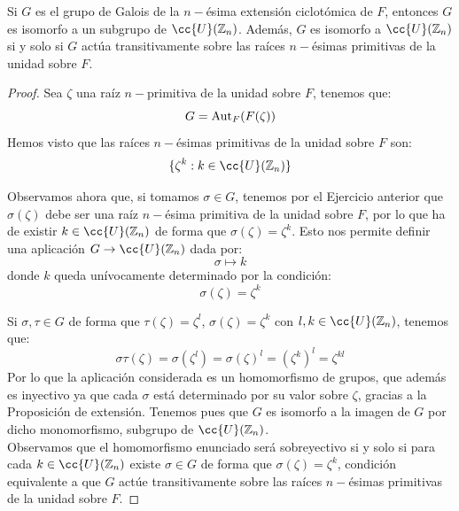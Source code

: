 \begin{prop}\label{prop:grupo_galois_ciclotomico}
    Si $G$ es el grupo de Galois de la $n-$ésima extensión ciclotómica de $F$, entonces $G$ es isomorfo a un subgrupo de $\cc{U}(\mathbb{Z}_n)$.\newline
    Además, $G$ es isomorfo a $\cc{U}(\mathbb{Z}_n)$ si y solo si $G$ actúa transitivamente sobre las raíces $n-$ésimas primitivas de la unidad sobre $F$.
    \begin{proof}
        Sea $\zeta$ una raíz $n-$primitiva de la unidad sobre $F$, tenemos que:
        \begin{equation*}
            G = \operatorname{Aut}_F(F(\zeta))
        \end{equation*}
        Hemos visto que las raíces $n-$ésimas primitivas de la unidad sobre $F$ son:
        \begin{equation*}
            \{\zeta^k : k\in \cc{U}(\mathbb{Z}_n)\}            
        \end{equation*}

        Observamos ahora que, si tomamos $\sigma\in G$, tenemos por el Ejercicio anterior que $\sigma(\zeta)$ debe ser una raíz $n-$ésima primitiva de la unidad sobre $F$, por lo que ha de existir $k\in \cc{U}(\mathbb{Z}_n)$ de forma que $\sigma(\zeta)=\zeta^k$. Esto nos permite definir una aplicación $G\to \cc{U}(\mathbb{Z}_n)$ dada por:
        \begin{equation*}
            \sigma \longmapsto k
        \end{equation*}
        donde $k$ queda unívocamente determinado por la condición:
        \begin{equation*}
            \sigma(\zeta) = \zeta^k
        \end{equation*}

        Si $\sigma,\tau\in G$ de forma que $\tau(\zeta) = \zeta^l$, $\sigma(\zeta)=\zeta^k$ con $l,k\in \cc{U}(\mathbb{Z}_n)$, tenemos que:
        \begin{equation*}
            \sigma\tau(\zeta) = \sigma(\zeta^l) = \sigma(\zeta)^l = {(\zeta^k)}^{l} = \zeta^{kl} 
        \end{equation*}
        Por lo que la aplicación considerada es un homomorfismo de grupos, que además es inyectivo ya que cada $\sigma$ está determinado por su valor sobre $\zeta$, gracias a la Proposición de extensión. Tenemos pues que $G$ es isomorfo a la imagen de $G$ por dicho monomorfismo, subgrupo de $\cc{U}(\mathbb{Z}_n)$.\\

        \noindent
        Observamos que el homomorfismo enunciado será sobreyectivo si y solo si para cada $k\in \cc{U}(\mathbb{Z}_n)$ existe $\sigma \in G$ de forma que $\sigma(\zeta) = \zeta^k$, condición equivalente a que $G$ actúe transitivamente sobre las raíces $n-$ésimas primitivas de la unidad sobre $F$.
    \end{proof}
\end{prop}

